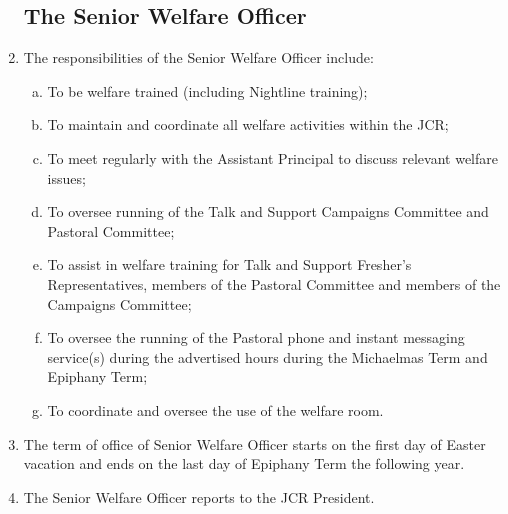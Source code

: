 \documentclass[12pt]{article}
\begin{document}
\begin{enumerate}
    \subsection{The Senior Welfare Officer}
    \item The responsibilities of the Senior Welfare Officer include:
    \begin{enumerate}[(a)]
        \item To be welfare trained (including Nightline training);
        \item To maintain and coordinate all welfare activities within the JCR;
        \item To meet regularly with the Assistant Principal to discuss relevant welfare issues;
        \item To oversee running of the Talk and Support Campaigns Committee and Pastoral Committee;
        \item To assist in welfare training for Talk and Support Fresher's Representatives, members of the Pastoral Committee and members of the Campaigns Committee;
        \item To oversee the running of the Pastoral phone and instant messaging service(s) during the advertised hours during the Michaelmas Term and Epiphany Term;
        \item To coordinate and oversee the use of the welfare room.
    \end{enumerate}
    \item The term of office of Senior Welfare Officer starts on the first day of Easter vacation and ends on the last day of Epiphany Term the following year.
    \item The Senior Welfare Officer reports to the JCR President.

\end{enumerate}
\end{document}
